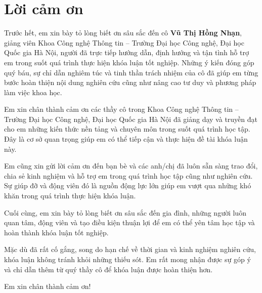 \clearpage
{}

\chapter*{Lời cảm ơn}

Trước hết, em xin bày tỏ lòng biết ơn sâu sắc đến cô \textbf{Vũ Thị Hồng Nhạn}, giảng viên Khoa Công nghệ Thông tin – Trường Đại học Công nghệ, Đại học Quốc gia Hà Nội, người đã trực tiếp hướng dẫn, định hướng và tận tình hỗ trợ em trong suốt quá trình thực hiện khóa luận tốt nghiệp. Những ý kiến đóng góp quý báu, sự chỉ dẫn nghiêm túc và tinh thần trách nhiệm của cô đã giúp em từng bước hoàn thiện nội dung nghiên cứu cũng như nâng cao tư duy và phương pháp làm việc khoa học.

\blocksep

Em xin chân thành cảm ơn các thầy cô trong Khoa Công nghệ Thông tin – Trường Đại học Công nghệ, Đại học Quốc gia Hà Nội đã giảng dạy và truyền đạt cho em những kiến thức nền tảng và chuyên môn trong suốt quá trình học tập. Đây là cơ sở quan trọng giúp em có thể tiếp cận và thực hiện đề tài khóa luận này.

\blocksep

Em cũng xin gửi lời cảm ơn đến bạn bè và các anh/chị đã luôn sẵn sàng trao đổi, chia sẻ kinh nghiệm và hỗ trợ em trong quá trình học tập cũng như nghiên cứu. Sự giúp đỡ và động viên đó là nguồn động lực lớn giúp em vượt qua những khó khăn trong quá trình thực hiện khóa luận.

\blocksep

Cuối cùng, em xin bày tỏ lòng biết ơn sâu sắc đến gia đình, những người luôn quan tâm, động viên và tạo điều kiện thuận lợi để em có thể yên tâm học tập và hoàn thành khóa luận tốt nghiệp.

\blocksep

Mặc dù đã rất cố gắng, song do hạn chế về thời gian và kinh nghiệm nghiên cứu, khóa luận không tránh khỏi những thiếu sót. Em rất mong nhận được sự góp ý và chỉ dẫn thêm từ quý thầy cô để khóa luận được hoàn thiện hơn.

\blocksep

Em xin chân thành cảm ơn!



